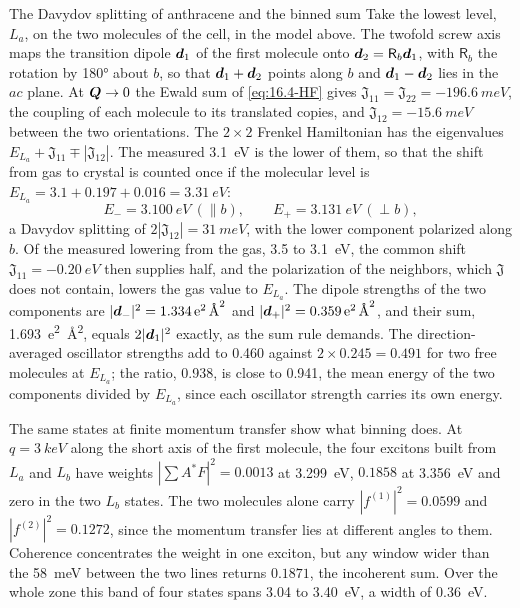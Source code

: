 \begin{workedexample}{The Davydov splitting of anthracene and the binned sum}\label{we:16-davydov}
Take the lowest level, $L_a$, on the two molecules of the cell, in the model above. The twofold screw axis maps the transition dipole $\bm{d}_1$ of the first molecule onto $\bm{d}_2 = \mathsf{R}_b\bm{d}_1$, with $\mathsf{R}_b$ the rotation by \ang{180} about $b$, so that $\bm{d}_1 + \bm{d}_2$ points along $b$ and $\bm{d}_1 - \bm{d}_2$ lies in the $ac$ plane. At $\bm{Q} \to 0$ the Ewald sum of \cref{eq:16.4-HF} gives $\mathfrak{J}_{11} = \mathfrak{J}_{22} = \SI{-196.6}{meV}$, the coupling of each molecule to its translated copies, and $\mathfrak{J}_{12} = \SI{-15.6}{meV}$ between the two orientations. The $2\times2$ Frenkel Hamiltonian has the eigenvalues $E_{L_a} + \mathfrak{J}_{11} \mp |\mathfrak{J}_{12}|$. The measured \SI{3.1}{eV} is the lower of them, so that the shift from gas to crystal is counted once if the molecular level is $E_{L_a} = 3.1 + 0.197 + 0.016 = \SI{3.31}{eV}$:
\begin{equation*}
  E_- = \SI{3.100}{eV}\ (\parallel b) , \qquad E_+ = \SI{3.131}{eV}\ (\perp b) ,
\end{equation*}
a Davydov splitting of $2|\mathfrak{J}_{12}| = \SI{31}{meV}$, with the lower component polarized along $b$. Of the measured lowering from the gas, 3.5 to \SI{3.1}{eV}, the common shift $\mathfrak{J}_{11} = \SI{-0.20}{eV}$ then supplies half, and the polarization of the neighbors, which $\mathfrak{J}$ does not contain, lowers the gas value to $E_{L_a}$. The dipole strengths of the two components are $|\bm{d}_-|^2 = \SI{1.334}{e^2.\angstrom^2}$ and $|\bm{d}_+|^2 = \SI{0.359}{e^2.\angstrom^2}$, and their sum, \SI{1.693}{e^2.\angstrom^2}, equals $2|\bm{d}_1|^2$ exactly, as the sum rule demands. The direction-averaged oscillator strengths add to 0.460 against $2\times0.245 = 0.491$ for two free molecules at $E_{L_a}$; the ratio, 0.938, is close to 0.941, the mean energy of the two components divided by $E_{L_a}$, since each oscillator strength carries its own energy.

The same states at finite momentum transfer show what binning does. At $q = \SI{3}{keV}$ along the short axis of the first molecule, the four excitons built from $L_a$ and $L_b$ have weights $|\sum A^*F|^2 = 0.0013$ at \SI{3.299}{eV}, $0.1858$ at \SI{3.356}{eV} and zero in the two $L_b$ states. The two molecules alone carry $|f^{(1)}|^2 = 0.0599$ and $|f^{(2)}|^2 = 0.1272$, since the momentum transfer lies at different angles to them. Coherence concentrates the weight in one exciton, but any window wider than the \SI{58}{meV} between the two lines returns $0.1871$, the incoherent sum. Over the whole zone this band of four states spans 3.04 to \SI{3.40}{eV}, a width of \SI{0.36}{eV}.
\end{workedexample}

